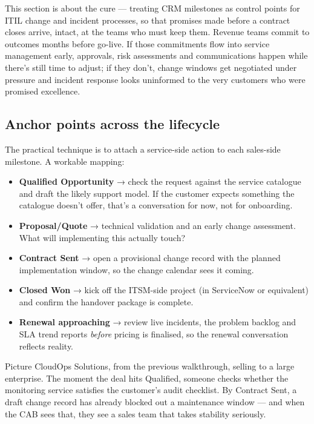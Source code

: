 This section is about the cure — treating CRM milestones as control points for ITIL change and incident processes, so that promises made before a contract closes arrive, intact, at the teams who must keep them. Revenue teams commit to outcomes months before go-live. If those commitments flow into service management early, approvals, risk assessments and communications happen while there's still time to adjust; if they don't, change windows get negotiated under pressure and incident response looks uninformed to the very customers who were promised excellence.



\subsection{Anchor points across the lifecycle}


The practical technique is to attach a service-side action to each sales-side milestone. A workable mapping:


\begin{itemize}[leftmargin=*]
\item \textbf{Qualified Opportunity} → check the request against the service catalogue and draft the likely support model. If the customer expects something the catalogue doesn't offer, that's a conversation for now, not for onboarding.
\item \textbf{Proposal/Quote} → technical validation and an early change assessment. What will implementing this actually touch?
\item \textbf{Contract Sent} → open a provisional change record with the planned implementation window, so the change calendar sees it coming.
\item \textbf{Closed Won} → kick off the ITSM-side project (in ServiceNow or equivalent) and confirm the handover package is complete.
\item \textbf{Renewal approaching} → review live incidents, the problem backlog and SLA trend reports \emph{before} pricing is finalised, so the renewal conversation reflects reality.
\end{itemize}

Picture CloudOps Solutions, from the previous walkthrough, selling to a large enterprise. The moment the deal hits Qualified, someone checks whether the monitoring service satisfies the customer's audit checklist. By Contract Sent, a draft change record has already blocked out a maintenance window — and when the CAB sees that, they see a sales team that takes stability seriously.



